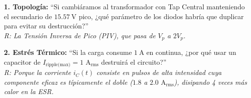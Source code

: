 \documentclass[11pt, a4paper]{article}
\begin{document}
\begin{aviso}
\textbf{1. Topología:} ``Si cambiáramos al transformador con Tap Central manteniendo el secundario de $\qty{15.57}{\volt}$ pico, ¿qué parámetro de los diodos habría que duplicar para evitar su destrucción?''\\
\textit{R: La Tensión Inversa de Pico (PIV), que pasa de $V_p$ a $2V_p$.}

\vspace{0.2cm}
\textbf{2. Estrés Térmico:} ``Si la carga consume $\qty{1}{\ampere}$ en continua, ¿por qué usar un capacitor de $I_{\text{ripple(max)}} = 1\text{ A}_{\text{rms}}$ destruirá el circuito?''\\
\textit{R: Porque la corriente $i_C(t)$ consiste en pulsos de alta intensidad cuya componente eficaz es típicamente el doble ($1.8$ a $2.0\text{ A}_{\text{rms}}$), disipando 4 veces más calor en la ESR.}
\end{aviso}
\end{document}
